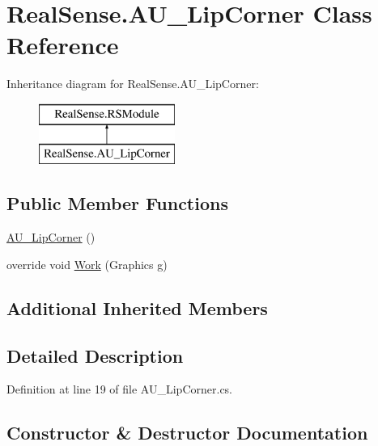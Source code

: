 \hypertarget{class_real_sense_1_1_a_u___lip_corner}{}\section{Real\+Sense.\+A\+U\+\_\+\+Lip\+Corner Class Reference}
\label{class_real_sense_1_1_a_u___lip_corner}
Inheritance diagram for Real\+Sense.\+A\+U\+\_\+\+Lip\+Corner\+:\begin{figure}[H]
\begin{center}
\leavevmode
\includegraphics[height=2.000000cm]{class_real_sense_1_1_a_u___lip_corner}
\end{center}
\end{figure}
\subsection*{Public Member Functions}
\begin{DoxyCompactItemize}
\item 
\hyperlink{class_real_sense_1_1_a_u___lip_corner_ae3bb4bd3aad86a0c83d5bc57b9bb0855}{A\+U\+\_\+\+Lip\+Corner} ()
\item 
override void \hyperlink{class_real_sense_1_1_a_u___lip_corner_a4a506c5dc50e7bcd8dcfa80cecbd7f56}{Work} (Graphics g)
\end{DoxyCompactItemize}
\subsection*{Additional Inherited Members}


\subsection{Detailed Description}


Definition at line 19 of file A\+U\+\_\+\+Lip\+Corner.\+cs.



\subsection{Constructor \& Destructor Documentation}
\mbox{\label{class_real_sense_1_1_a_u___lip_corner_ae3bb4bd3aad86a0c83d5bc57b9bb0855}} 
